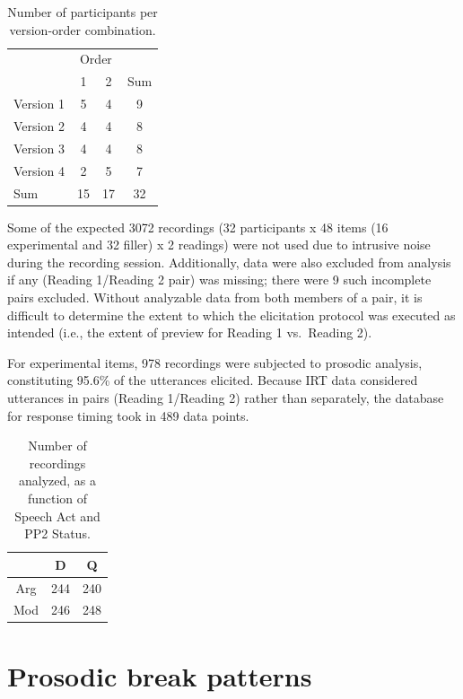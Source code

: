 \documentclass[12pt,oneside]{book}
\begin{document}
\begin{table}[!h]

\caption{\label{tab:vtab}Number of participants per version-order combination.}
\centering
\begin{tabular}{lccc}
\toprule
\multicolumn{1}{c}{ } & \multicolumn{2}{c}{Order} & \multicolumn{1}{c}{ } \\
\cmidrule(l{3pt}r{3pt}){2-3}
  & 1 & 2 & Sum\\
\midrule
Version 1 & 5 & 4 & 9\\
Version 2 & 4 & 4 & 8\\
Version 3 & 4 & 4 & 8\\
Version 4 & 2 & 5 & 7\\
Sum & 15 & 17 & 32\\
\bottomrule
\end{tabular}
\end{table}

Some of the expected 3072 recordings (32 participants x 48 items (16 experimental and 32 filler) x 2 readings) were not used due to intrusive noise during the recording session. Additionally, data were also excluded from analysis if any (Reading 1/Reading 2 pair) was missing; there were 9 such incomplete pairs excluded. Without analyzable data from both members of a pair, it is difficult to determine the extent to which the elicitation protocol was executed as intended (i.e., the extent of preview for Reading 1 vs.~Reading 2).

For experimental items, 978 recordings were subjected to prosodic analysis, constituting 95.6\% of the utterances elicited. Because IRT data considered utterances in pairs (Reading 1/Reading 2) rather than separately, the database for response timing took in 489 data points.

\begin{table}[!h]

\caption{\label{tab:rvtab}Number of recordings analyzed, as a function of Speech Act and PP2 Status.}
\centering
\begin{tabular}{ccc}
\toprule
  & D & Q\\
\midrule
Arg & 244 & 240\\
Mod & 246 & 248\\
\bottomrule
\end{tabular}
\end{table}

\hypertarget{results-prosody}{%
\section{Prosodic break patterns}\label{results-prosody}}
\end{document}
